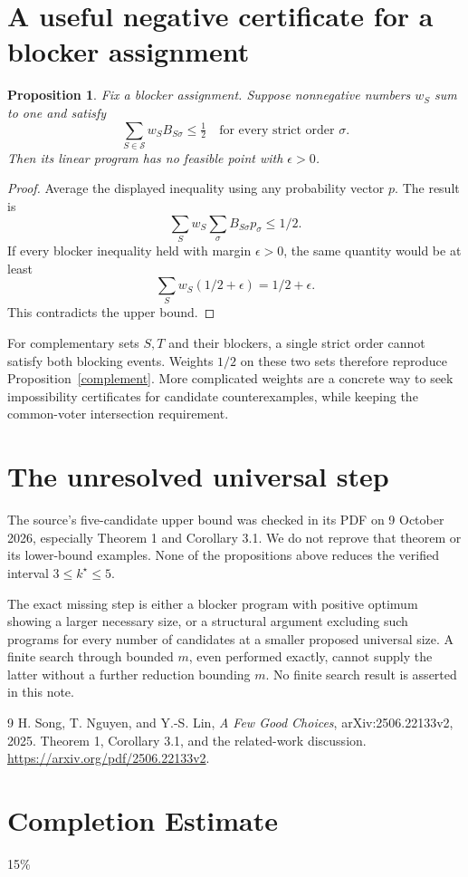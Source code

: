 \documentclass[11pt]{article}
\newtheorem{proposition}[theorem]{Proposition}
\theoremstyle{definition}
\begin{document}
\section{A useful negative certificate for a blocker assignment}
\begin{proposition}\label{weights}
Fix a blocker assignment. Suppose nonnegative numbers $w_S$ sum to one
and satisfy
\[
 \sum_{S\in\mathcal S}w_SB_{S\sigma}\le\tfrac12
                    \quad\text{for every strict order }\sigma.
\]
Then its linear program has no feasible point with $\epsilon>0$.
\end{proposition}
\begin{proof}
Average the displayed inequality using any probability vector $p$.
The result is
\[\sum_Sw_S\sum_\sigma B_{S\sigma}p_\sigma\le1/2.\]
If every blocker inequality held with margin $\epsilon>0$, the same
quantity would be at least
\[\sum_Sw_S(1/2+\epsilon)=1/2+\epsilon.\]
This contradicts the upper bound.
\end{proof}
For complementary sets $S,T$ and their blockers, a single strict order
cannot satisfy both blocking events. Weights $1/2$ on these two sets
therefore reproduce Proposition~\ref{complement}. More complicated
weights are a concrete way to seek impossibility certificates for candidate
counterexamples, while keeping the common-voter intersection requirement.

\section{The unresolved universal step}
The source's five-candidate upper bound was checked in its PDF on
9 October 2026, especially Theorem 1 and Corollary 3.1. We do not reprove
that theorem or its lower-bound examples. None of the propositions above
reduces the verified interval $3\le k^\star\le5$.

The exact missing step is either a blocker program with positive optimum
showing a larger necessary size, or a structural argument excluding such
programs for every number of candidates at a smaller proposed universal
size. A finite search through bounded $m$, even performed exactly, cannot
supply the latter without a further reduction bounding $m$. No finite
search result is asserted in this note.
\begin{thebibliography}{9}
 H. Song, T. Nguyen, and Y.-S. Lin,
\emph{A Few Good Choices}, arXiv:2506.22133v2, 2025.
Theorem 1, Corollary 3.1, and the related-work discussion.
\url{https://arxiv.org/pdf/2506.22133v2}.
\end{thebibliography}

\section{Completion Estimate}
15\%
\end{document}
